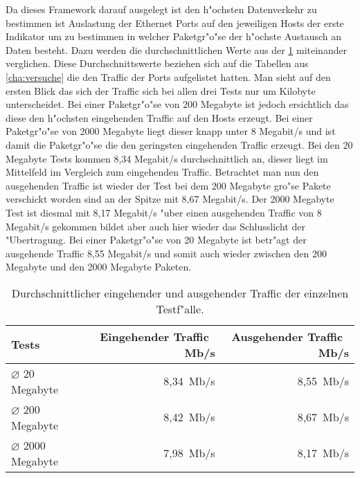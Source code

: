 Da dieses Framework darauf ausgelegt ist den h"ochsten Datenverkehr zu bestimmen ist %
Auslastung der Ethernet Ports auf den jeweiligen Hosts der erste Indikator um zu bestimmen %
in welcher Paketgr"o"se der h"ochste Austausch an Daten besteht. Dazu werden die durchschnittlichen %
Werte aus der \cref{tab:compTraffic} miteinander verglichen. Diese Durchschnittswerte beziehen sich %
auf die Tabellen aus \cref{cha:versuche} die den Traffic der Ports aufgelistet hatten. Man sieht %
auf den ersten Blick das sich der Traffic sich bei allen drei Tests nur um Kilobyte unterscheidet. %
Bei einer Paketgr"o"se von 200 Megabyte ist jedoch ersichtlich das diese den h"ochsten eingehenden %
Traffic auf den Hosts erzeugt. Bei einer Paketgr"o"se von 2000 Megabyte liegt dieser knapp unter %
8 Megabit/s und ist damit die Paketgr"o"se die den geringsten eingehenden Traffic erzeugt. Bei %
den 20 Megabyte Tests kommen 8,34 Megabit/s durchschnittlich an, dieser liegt im Mittelfeld %
im Vergleich zum eingehenden Traffic. Betrachtet man nun den ausgehenden Traffic ist wieder %
der Test bei dem 200 Megabyte gro"se Pakete verschickt worden sind an der Spitze mit 8,67 %
Megabit/s. Der 2000 Megabyte Test ist diesmal mit 8,17 Megabit/s "uber einen ausgehenden %
Traffic von 8 Megabit/s gekommen bildet aber auch hier wieder das Schlusslicht der "Ubertragung. %
Bei einer Paketgr"o"se von 20 Megabyte ist betr"agt der ausgehende Traffic 8,55 Megabit/s und %
somit auch wieder zwischen den 200 Megabyte und den 2000 Megabyte Paketen. %

\begin{table}
\centering
\begin{tabular}{l%
 r<{\,Mb/s}%
 r<{\,Mb/s}%
}
Tests  					& Eingehender Traffic	& Ausgehender Traffic	\\
\hline
$\diameter$ \hspace{8pt} 20 Megabyte  	& 8,34			& 8,55 			\\
$\diameter$ \hspace{6pt}200 Megabyte  	& 8,42			& 8,67			\\
$\diameter$ 2000 Megabyte	  	& 7,98			& 8,17			\\
\end{tabular}
\caption{Durchschnittlicher eingehender und ausgehender Traffic der einzelnen Testf"alle.}
\label{tab:compTraffic}

\end{table}

